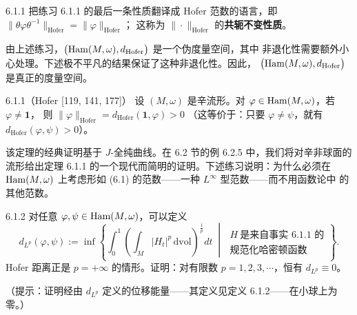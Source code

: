 \begin{wrem}{6.1.1}
  把练习 6.1.1 的最后一条性质翻译成 Hofer 范数的语言，即
  $\|\theta\varphi\theta^{-1}\|_{\mathrm{Hofer}}=\|\varphi\|_{\mathrm{Hofer}}$；
  这称为 $\|\cdot\|_{\mathrm{Hofer}}$ 的\textbf{共轭不变性质}。
\end{wrem}


由上述练习，$\bigl(\operatorname{Ham}(M,\omega),d_{\mathrm{Hofer}}\bigr)$ 是一个伪度量空间，其中
非退化性需要额外小心处理。下述极不平凡的结果保证了这种非退化性。因此，
$\bigl(\operatorname{Ham}(M,\omega),d_{\mathrm{Hofer}}\bigr)$ 是真正的度量空间。

\begin{wthm}{6.1.1（Hofer [119, 141, 177]）}
  设 $(M,\omega)$ 是辛流形。对 $\varphi\in\operatorname{Ham}(M,\omega)$，若 $\varphi\ne\mathbf{1}$，
  则 $\|\varphi\|_{\mathrm{Hofer}}=d_{\mathrm{Hofer}}(\mathbf{1},\varphi)>0$
  （这等价于：只要 $\varphi\ne\psi$，就有 $d_{\mathrm{Hofer}}(\varphi,\psi)>0$）。
\end{wthm}

该定理的经典证明基于 $J$-全纯曲线。在 6.2 节的例 6.2.5 中，我们将对辛非球面的
流形给出定理 6.1.1 的一个现代而简明的证明。下述练习说明：为什么必须在
$\operatorname{Ham}(M,\omega)$ 上考虑形如 (6.1) 的范数——一种 $L^\infty$ 型范数——而不用函数论中
的其他范数。

\begin{wexer}{6.1.2}
  对任意 $\varphi,\psi\in\operatorname{Ham}(M,\omega)$，可以定义
  \[
    d_{L^p}(\varphi,\psi):=\inf\left\{
    \int_0^1\left(\int_M|H_t|^p\,\mathrm{dvol}\right)^{\frac{1}{p}}dt
    \;\middle|\;
    \begin{array}{l}
      H\ \text{是来自事实 6.1.1 的}\\
      \text{规范化哈密顿函数}
    \end{array}\right\}.
  \]
  Hofer 距离正是 $p=+\infty$ 的情形。证明：对有限数 $p=1,2,3,\cdots$，恒有
  $d_{L^p}\equiv 0$。
\end{wexer}

（提示：证明经由 $d_{L^p}$ 定义的位移能量——其定义见定义 6.1.2——在小球上为零。）

